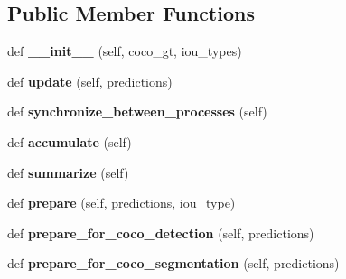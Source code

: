 \subsection*{Public Member Functions}
\begin{DoxyCompactItemize}
\item 
\mbox{\label{classcoco__eval_1_1CocoEvaluator_aa6ca6db29fd99e5ad9593e09cfe612f7}} 
def {\bfseries \+\_\+\+\_\+init\+\_\+\+\_\+} (self, coco\+\_\+gt, iou\+\_\+types)
\item 
\mbox{\label{classcoco__eval_1_1CocoEvaluator_a066d983e53c241c8e1157232eee87bfc}} 
def {\bfseries update} (self, predictions)
\item 
\mbox{\label{classcoco__eval_1_1CocoEvaluator_af771ae7f67af60c60585f796b9790944}} 
def {\bfseries synchronize\+\_\+between\+\_\+processes} (self)
\item 
\mbox{\label{classcoco__eval_1_1CocoEvaluator_a75b0c29c47aae7c31dd488f8a09a76b6}} 
def {\bfseries accumulate} (self)
\item 
\mbox{\label{classcoco__eval_1_1CocoEvaluator_afe5b5f733e530d37dc2aa2be6bd07ffd}} 
def {\bfseries summarize} (self)
\item 
\mbox{\label{classcoco__eval_1_1CocoEvaluator_a787d74058162455b31ee3f7b9db3c801}} 
def {\bfseries prepare} (self, predictions, iou\+\_\+type)
\item 
\mbox{\label{classcoco__eval_1_1CocoEvaluator_a4782b814b562ff950acba6c0c85c20cb}} 
def {\bfseries prepare\+\_\+for\+\_\+coco\+\_\+detection} (self, predictions)
\item 
\mbox{\label{classcoco__eval_1_1CocoEvaluator_a4e68ed07bfac6e2c04baab7975191b75}} 
def {\bfseries prepare\+\_\+for\+\_\+coco\+\_\+segmentation} (self, predictions)
\item 
\mbox{\label{classcoco__eval_1_1CocoEvaluator_ac87c29e6c2361dab48e85dcbb734b760}} 

\end{DoxyCompactItemize}

